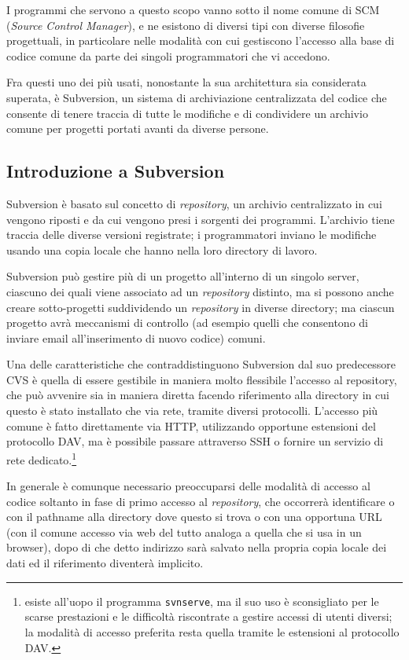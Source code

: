 I programmi che servono a questo scopo vanno sotto il nome comune di SCM
(\textit{Source Control Manager}), e ne esistono di diversi tipi con diverse
filosofie progettuali, in particolare nelle modalità con cui gestiscono
l'accesso alla base di codice comune da parte dei singoli programmatori che vi
accedono.

Fra questi uno dei più usati, nonostante la sua architettura sia considerata
superata, è Subversion, un sistema di archiviazione centralizzata del codice
che consente di tenere traccia di tutte le modifiche e di condividere un
archivio comune per progetti portati avanti da diverse persone.

\subsection{Introduzione a Subversion}
\label{sec:build_subversion}

Subversion è basato sul concetto di \textit{repository}, un archivio
centralizzato in cui vengono riposti e da cui vengono presi i sorgenti dei
programmi. L'archivio tiene traccia delle diverse versioni registrate; i
programmatori inviano le modifiche usando una copia locale che hanno nella
loro directory di lavoro.

Subversion può gestire più di un progetto all'interno di un singolo server,
ciascuno dei quali viene associato ad un \textit{repository} distinto, ma si
possono anche creare sotto-progetti suddividendo un \textit{repository} in
diverse directory; ma ciascun progetto avrà meccanismi di controllo (ad 
esempio quelli che consentono di inviare email all'inserimento di nuovo
codice) comuni.

Una delle caratteristiche che contraddistinguono Subversion dal suo
predecessore CVS è quella di essere gestibile in maniera molto flessibile
l'accesso al repository, che può avvenire sia in maniera diretta facendo
riferimento alla directory in cui questo è stato installato che via rete,
tramite diversi protocolli. L'accesso più comune è fatto direttamente via
HTTP, utilizzando opportune estensioni del protocollo DAV, ma è possibile
passare attraverso SSH o fornire un servizio di rete dedicato.\footnote{esiste
  all'uopo il programma \texttt{svnserve}, ma il suo uso è sconsigliato per le
  scarse prestazioni e le difficoltà riscontrate a gestire accessi di utenti
  diversi; la modalità di accesso preferita resta quella tramite le estensioni
  al protocollo DAV.}

In generale è comunque necessario preoccuparsi delle modalità di accesso al
codice soltanto in fase di primo accesso al \textit{repository}, che occorrerà
identificare o con il pathname alla directory dove questo si trova o con una
opportuna URL (con il comune accesso via web del tutto analoga a quella che si
usa in un browser), dopo di che detto indirizzo sarà salvato nella propria
copia locale dei dati ed il riferimento diventerà implicito.

